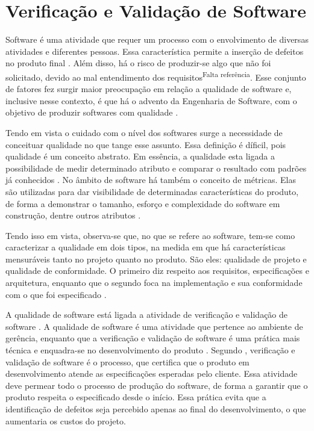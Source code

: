 \section{Verificação e Validação de Software}
Software é uma atividade que requer um processo com o envolvimento de diversas atividades e diferentes pessoas. Essa característica permite a inserção de defeitos no produto final \cite{trodo2009}. Além disso, há o risco de produzir-se algo que não foi solicitado, devido ao mal entendimento dos requisitos\textsuperscript{Falta referência}. Esse conjunto de fatores fez surgir maior preocupação em relação a qualidade de software e, inclusive nesse contexto, é que há o advento da Engenharia de Software, com o objetivo de produzir softwares com qualidade \cite{buenoCampelo2013}.
\par
\indent Tendo em vista o cuidado com o nível dos softwares surge a necessidade de conceituar qualidade no que tange esse assunto. Essa definição é díficil, pois qualidade é um conceito abstrato. Em essência, a qualidade esta ligada a possibilidade de medir determinado atributo e comparar o resultado com padrões já conhecidos \cite{buenoCampelo2013}. No âmbito de software há também o conceito de métricas. Elas são utilizadas para dar visibilidade de determinadas características do produto, de forma a demonstrar o tamanho, esforço e complexidade do software em construção, dentre outros atributos \cite{abreu2011}.
\par
\indent Tendo isso em vista, observa-se que, no que se refere ao software, tem-se como caracterizar a qualidade em dois tipos, na medida em que há características mensuráveis tanto no projeto quanto no produto. São eles: qualidade de projeto e qualidade de conformidade. O primeiro diz respeito aos requisitos, especificações e arquitetura, enquanto que o segundo foca na implementação e sua conformidade com o que foi especificado \cite{buenoCampelo2013}.
\par
\indent A qualidade de software está ligada a atividade de verificação e validação de software \cite{buenoCampelo2013}. A qualidade de software é uma atividade que pertence ao ambiente de gerência, enquanto que a verificação e validação de software é uma prática mais técnica e enquadra-se no desenvolvimento do produto \cite{buenoCampelo2013}. Segundo , verificação e validação de software é o processo, que certifica que o produto em desenvolvimento atende as especificações esperadas pelo cliente. Essa atividade deve permear todo o processo de produção do software, de forma a garantir que o produto respeita o especificado desde o início. Essa prática evita que a identificação de defeitos seja percebido apenas ao final do desenvolvimento, o que aumentaria os custos do projeto.

